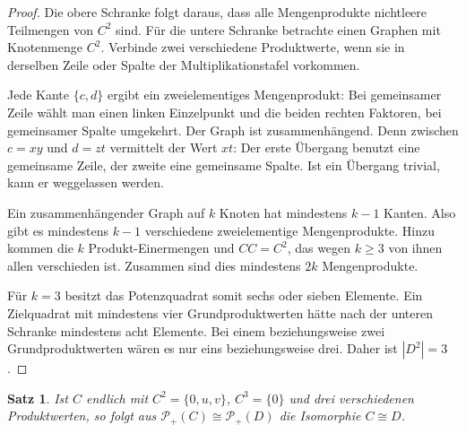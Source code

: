 \documentclass[a4paper,11pt]{article}
\newcommand{\Pp}[1]{\mathcal P_+(#1)}
\newtheorem{satz}{Satz}
\begin{document}
\begin{proof}
Die obere Schranke folgt daraus, dass alle Mengenprodukte nichtleere
Teilmengen von \(C^2\) sind. Für die untere Schranke betrachte einen
Graphen mit Knotenmenge \(C^2\). Verbinde zwei verschiedene Produktwerte,
wenn sie in derselben Zeile oder Spalte der Multiplikationstafel
vorkommen.

Jede Kante \(\{c,d\}\) ergibt ein zweielementiges Mengenprodukt:
Bei gemeinsamer Zeile wählt man einen linken Einzelpunkt und die
beiden rechten Faktoren, bei gemeinsamer Spalte umgekehrt.
Der Graph ist zusammenhängend. Denn zwischen \(c=xy\) und \(d=zt\)
vermittelt der Wert \(xt\): Der erste Übergang benutzt eine gemeinsame
Zeile, der zweite eine gemeinsame Spalte. Ist ein Übergang trivial,
kann er weggelassen werden.

Ein zusammenhängender Graph auf \(k\) Knoten hat mindestens \(k-1\)
Kanten. Also gibt es mindestens \(k-1\) verschiedene zweielementige
Mengenprodukte. Hinzu kommen die \(k\) Produkt-Einermengen und
\(CC=C^2\), das wegen \(k\ge3\) von ihnen allen verschieden ist.
Zusammen sind dies mindestens \(2k\) Mengenprodukte.

Für \(k=3\) besitzt das Potenzquadrat somit sechs oder sieben
Elemente. Ein Zielquadrat mit mindestens vier Grundproduktwerten
hätte nach der unteren Schranke mindestens acht Elemente.
Bei einem beziehungsweise zwei Grundproduktwerten wären es nur
eins beziehungsweise drei. Daher ist \(|D^2|=3\).
\end{proof}

\begin{satz}\label{cp:three}
Ist \(C\) endlich mit \(C^2=\{0,u,v\}\),
\(C^3=\{0\}\) und drei verschiedenen Produktwerten, so folgt aus
\(\Pp C\cong\Pp D\) die Isomorphie \(C\cong D\).
\end{satz}
\end{document}
